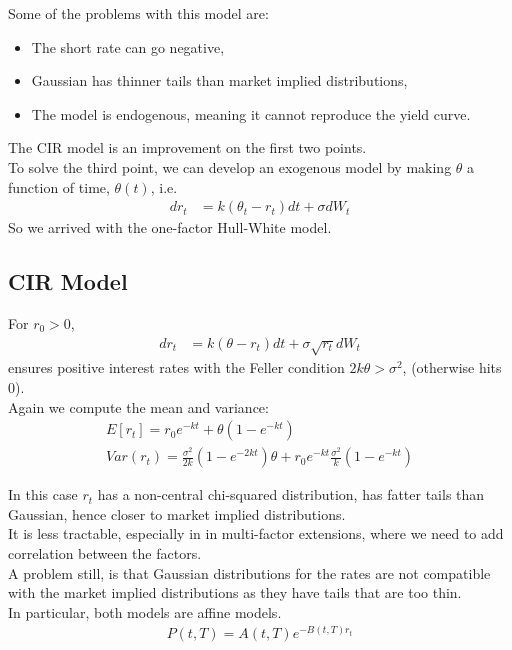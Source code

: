 Some of the problems with this model are:
\begin{itemize}
    \item The short rate can go negative,
    \item Gaussian has thinner tails than market implied distributions, 
    \item The model is endogenous, meaning it cannot reproduce the yield curve.
\end{itemize}
The CIR model is an improvement on the first two points.\\
To solve the third point, we can develop an exogenous model by making
$\theta$ a function of time, $\theta(t)$, i.e.
\begin{align*}
    dr_t &= k(\theta_t-r_t)dt + \sigma dW_t
\end{align*}
So we arrived with the one-factor Hull-White model.\\

\subsection{CIR Model}
For $r_0 > 0$, 
\begin{align*}
dr_t &= k(\theta-r_t)dt + \sigma \sqrt{r_t} dW_t
\end{align*}
ensures positive interest rates with the Feller condition $2k\theta > \sigma^2$, 
(otherwise hits 0).\\
Again we compute the mean and variance:
\begin{align*}
    E[r_t] = r_0 e^{-kt} + \theta(1-e^{-kt})\\
    Var(r_t) = \frac{\sigma^2}{2k}(1-e^{-2kt})\theta + 
    r_0 e^{-kt}\frac{\sigma^2}{k}(1-e^{-kt})
\end{align*}

In this case $r_t$ has a non-central chi-squared distribution, 
has fatter tails than Gaussian, hence closer to market implied distributions.\\
It is less tractable, especially in in multi-factor extensions,
where we need to add correlation between the factors.\\

A problem still, is that Gaussian distributions for the rates are not compatible with the market
implied distributions as they have tails that are too thin.\\

In particular, both models are affine models.
\begin{align*}
    P(t, T) = A(t, T) e^{-B(t, T)r_t}
\end{align*}

